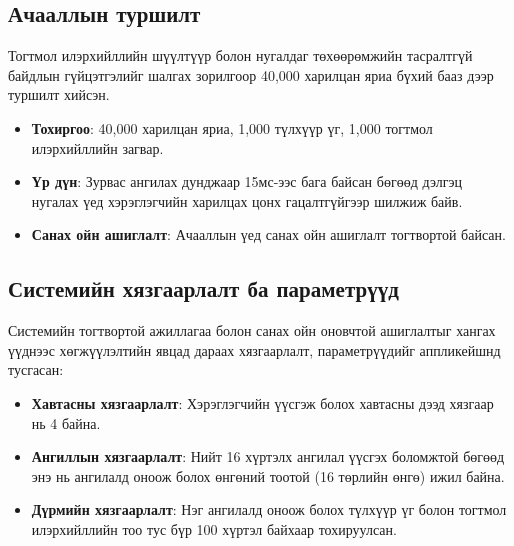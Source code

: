 \begin{table}[H]
    \centering
    \caption{Нэгж туршилтын үр дүнгийн нэгтгэл}
    \label{table:unit_tests}
\end{table}

\subsection{Ачааллын туршилт}
Тогтмол илэрхийллийн шүүлтүүр болон нугалдаг төхөөрөмжийн тасралтгүй байдлын гүйцэтгэлийг шалгах зорилгоор 40,000 харилцан яриа бүхий бааз дээр туршилт хийсэн.
\begin{itemize}
    \item \textbf{Тохиргоо}: 40,000 харилцан яриа, 1,000 түлхүүр үг, 1,000 тогтмол илэрхийллийн загвар.
    \item \textbf{Үр дүн}: Зурвас ангилах дунджаар  15мс-ээс бага байсан бөгөөд дэлгэц нугалах үед хэрэглэгчийн харилцах цонх гацалтгүйгээр шилжиж байв.
    \item \textbf{Санах ойн ашиглалт}: Ачааллын үед санах ойн ашиглалт тогтвортой байсан.
\end{itemize}
\subsection{Системийн хязгаарлалт ба параметрүүд}
Системийн тогтвортой ажиллагаа болон санах ойн оновчтой ашиглалтыг хангах үүднээс хөгжүүлэлтийн явцад дараах хязгаарлалт, параметрүүдийг аппликейшнд тусгасан:
\begin{itemize}
    \item \textbf{Хавтасны хязгаарлалт}: Хэрэглэгчийн үүсгэж болох хавтасны дээд хязгаар нь 4 байна.
    \item \textbf{Ангиллын хязгаарлалт}: Нийт 16 хүртэлх ангилал үүсгэх боломжтой бөгөөд энэ нь ангилалд оноож болох өнгөний тоотой (16 төрлийн өнгө) ижил байна.
    \item \textbf{Дүрмийн хязгаарлалт}: Нэг ангилалд оноож болох түлхүүр үг болон тогтмол илэрхийллийн тоо тус бүр 100 хүртэл байхаар тохируулсан.
\end{itemize}
